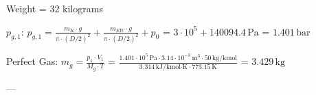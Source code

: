 Weight = 32 kilograms  

\( p_{g,1} \):  
\( p_{g,1} = \frac{m_K \cdot g}{\pi \cdot (D/2)^2} + \frac{m_{EW} \cdot g}{\pi \cdot (D/2)^2} + p_0 \)  
= \( 3 \cdot 10^5 + 140094.4 \, \text{Pa} \)  
= \( 1.401 \, \text{bar} \)  

Perfect Gas:  
\( m_g = \frac{p_1 \cdot V_1}{M_g \cdot T} \)  
= \( \frac{1.401 \cdot 10^5 \, \text{Pa} \cdot 3.14 \cdot 10^{-3} \, \text{m}^3 \cdot 50 \, \text{kg/kmol}}{3.314 \, \text{kJ/kmol·K} \cdot 773.15 \, \text{K}} \)  
= \( 3.429 \, \text{kg} \)  

---